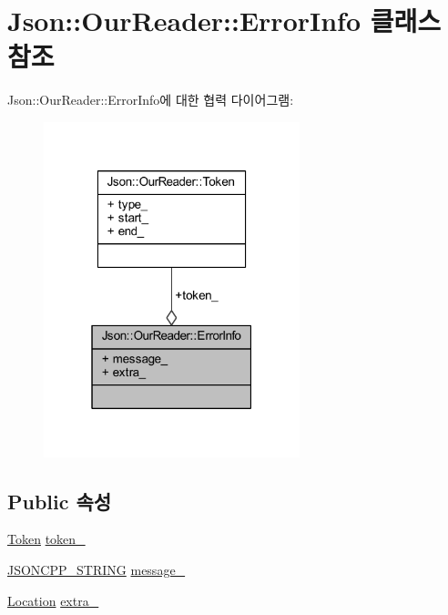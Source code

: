 \hypertarget{class_json_1_1_our_reader_1_1_error_info}{}\section{Json\+:\+:Our\+Reader\+:\+:Error\+Info 클래스 참조}
\label{class_json_1_1_our_reader_1_1_error_info}


Json\+:\+:Our\+Reader\+:\+:Error\+Info에 대한 협력 다이어그램\+:\nopagebreak
\begin{figure}[H]
\begin{center}
\leavevmode
\includegraphics[width=211pt]{class_json_1_1_our_reader_1_1_error_info__coll__graph}
\end{center}
\end{figure}
\subsection*{Public 속성}
\begin{DoxyCompactItemize}
\item 
\hyperlink{class_json_1_1_our_reader_1_1_token}{Token} \hyperlink{class_json_1_1_our_reader_1_1_error_info_ad05204ecabe5e7201a842935b874ae9a}{token\+\_\+}
\item 
\hyperlink{json_8h_a1e723f95759de062585bc4a8fd3fa4be}{J\+S\+O\+N\+C\+P\+P\+\_\+\+S\+T\+R\+I\+NG} \hyperlink{class_json_1_1_our_reader_1_1_error_info_af14b6bf58ee1cb3388c18ee336ee2394}{message\+\_\+}
\item 
\hyperlink{class_json_1_1_our_reader_a1bdc7bbc52ba87cae6b19746f2ee0189}{Location} \hyperlink{class_json_1_1_our_reader_1_1_error_info_a77ba2d32a471c7b9bc14621b76a5bdab}{extra\+\_\+}
\end{DoxyCompactItemize}


